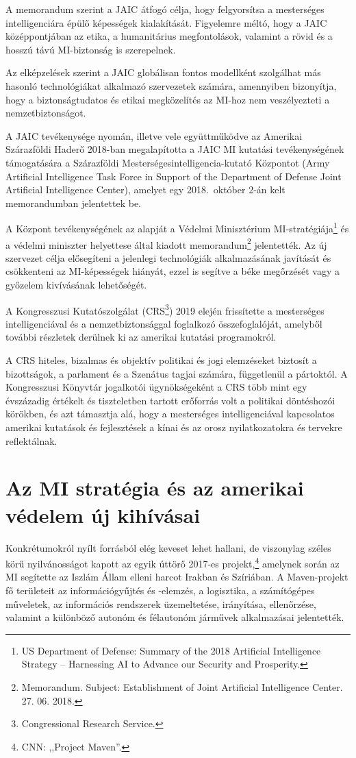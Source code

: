 \documentclass[
]{thesis-ekf}
\theoremstyle{definition}
\theoremstyle{remark}
\begin{document}
	A memorandum szerint a JAIC átfogó célja, hogy felgyorsítsa a mesterséges intelligenciára épülő képességek kialakítását. Figyelemre méltó, hogy a JAIC középpontjában az etika, a humanitárius megfontolások, valamint a rövid és a hosszú távú MI-biztonság is szerepelnek.
	
	Az elképzelések szerint a JAIC globálisan fontos modellként szolgálhat más hasonló technológiákat alkalmazó szervezetek számára, amennyiben bizonyítja, hogy a biztonságtudatos és etikai megközelítés az MI-hoz nem veszélyezteti a nemzetbiztonságot.
	
	A JAIC tevékenysége nyomán, illetve vele együttműködve az Amerikai Szárazföldi Haderő 2018-ban megalapította a JAIC MI kutatási tevékenységének támogatására a Szárazföldi Mesterségesintelligencia-kutató Központot (Army Artificial Intelligence Task Force in Support of the Department of Defense Joint Artificial Intelligence Center), amelyet egy 2018.~október 2-án kelt memorandumban jelentettek be.
	
	A Központ tevékenységének az alapját a Védelmi Minisztérium MI-stratégiája\footnote{US Department of Defense: Summary of the 2018 Artificial Intelligence Strategy – Harnessing AI to Advance our Security and Prosperity.} és a védelmi miniszter helyettese által kiadott memorandum\footnote{Memorandum. Subject: Establishment of Joint Artificial Intelligence Center. 27. 06. 2018.} jelentették. Az új szervezet célja elősegíteni a jelenlegi technológiák alkalmazásának javítását és csökkenteni az MI-képességek hiányát, ezzel is segítve a béke megőrzését vagy a győzelem kivívásának lehetőségét.
	
	A Kongresszusi Kutatószolgálat (CRS\footnote{Congressional Research Service.}) 2019 elején frissítette a mesterséges intelligenciával és a nemzetbiztonsággal foglalkozó összefoglalóját, amelyből további részletek derülnek ki az amerikai kutatási programokról.
	
	A CRS hiteles, bizalmas és objektív politikai és jogi elemzéseket biztosít a bizottságok, a parlament és a Szenátus tagjai számára, függetlenül a pártoktól. A Kongresszusi Könyvtár jogalkotói ügynökségeként a CRS több mint egy évszázadig értékelt és tiszteletben tartott erőforrás volt a politikai döntéshozói körökben, és azt támasztja alá, hogy a mesterséges intelligenciával kapcsolatos amerikai kutatások és fejlesztések a kínai és az orosz nyilatkozatokra és tervekre reflektálnak.
	
	\section{Az MI stratégia és az amerikai védelem új kihívásai}
	Konkrétumokról nyílt forrásból elég keveset lehet hallani, de viszonylag széles körű nyilvánosságot kapott az egyik úttörő 2017-es projekt,\footnote{CNN: ,,Project Maven''.}
	amelynek során az MI segítette az Iszlám Állam elleni harcot Irakban és Szíriában. A Maven-projekt fő területeit az információgyűjtés és -elemzés, a logisztika, a számítógépes műveletek, az információs rendszerek üzemeltetése, irányítása, ellenőrzése, valamint a különböző autonóm és félautonóm járművek alkalmazásai jelentették.
	
\end{document}
